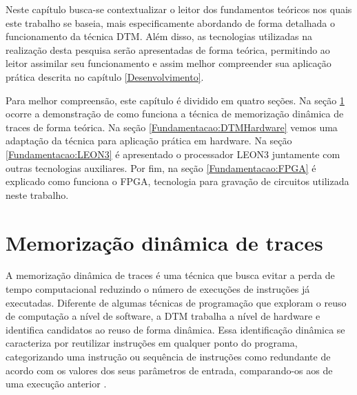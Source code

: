 \label{Fundamentacao}
%
%
%

Neste capítulo busca-se contextualizar o leitor dos fundamentos teóricos nos quais este trabalho se baseia, mais especificamente abordando de forma detalhada o funcionamento da técnica DTM. Além disso, as tecnologias utilizadas na realização desta pesquisa serão apresentadas de forma teórica, permitindo ao leitor assimilar seu funcionamento e assim melhor compreender sua aplicação prática descrita no capítulo \ref{Desenvolvimento}.

Para melhor compreensão, este capítulo é dividido em quatro seções. Na seção \ref{Fundamentacao:DTM} ocorre a demonstração de como funciona a técnica de memorização dinâmica de traces de forma teórica. Na seção \ref{Fundamentacao:DTMHardware} vemos uma adaptação da técnica para aplicação prática em hardware. Na seção \ref{Fundamentacao:LEON3} é apresentado o processador LEON3 juntamente com outras tecnologias auxiliares. Por fim, na seção \ref{Fundamentacao:FPGA} é explicado como funciona o FPGA, tecnologia para gravação de circuitos utilizada neste trabalho.


\section{Memorização dinâmica de traces}
\label{Fundamentacao:DTM}

A memorização dinâmica de traces é uma técnica que busca evitar a perda de tempo computacional reduzindo o número de execuções de instruções já executadas. Diferente de algumas técnicas de programação que exploram o reuso de computação a nível de software, a DTM trabalha a nível de hardware e identifica candidatos ao reuso de forma dinâmica. Essa identificação dinâmica se caracteriza por reutilizar instruções em qualquer ponto do programa, categorizando uma instrução ou sequência de instruções como redundante de acordo com os valores dos seus parâmetros de entrada, comparando-os aos de uma execução anterior \cite{costa2001explorando}.

